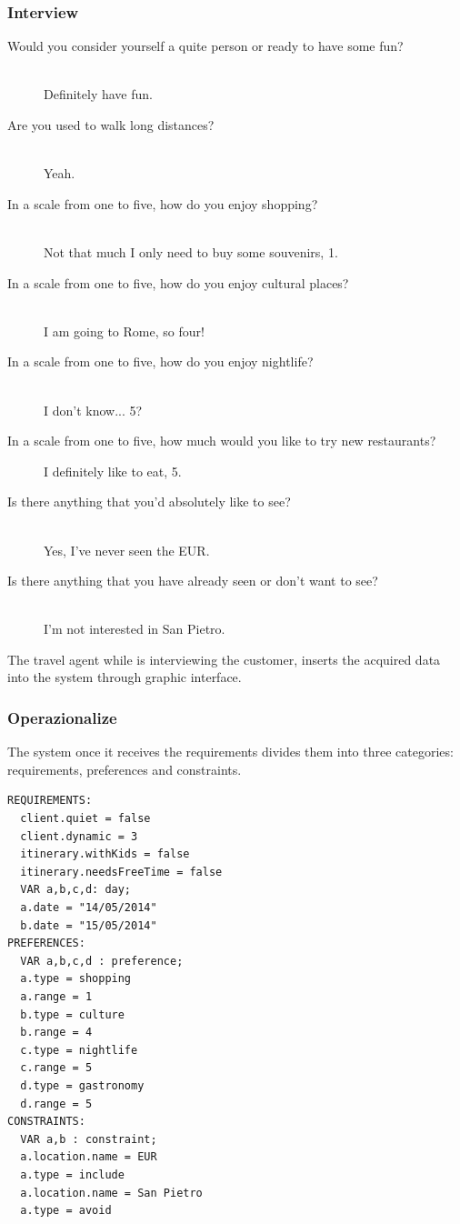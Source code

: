 \documentclass[11pt]{article} %
\begin{document}
\subsubsection{Interview} 

\begin{description}
  \item[Would you consider yourself a quite person or ready to have some fun?] \hfill \\
  Definitely have fun.
  \item[Are you used to walk long distances?] \hfill \\
  Yeah.
  \item[In a scale from one to five, how do you enjoy shopping?] \hfill \\
  Not that much I only need to buy some souvenirs, 1.
  \item[In a scale from one to five, how do you enjoy cultural places?] \hfill \\
  I am going to Rome, so four!
  \item[In a scale from one to five, how do you enjoy nightlife?] \hfill \\
  I don't know... 5?
  \item[In a scale from one to five, how much would you like to try new restaurants?] \hfill 
  I definitely like to eat, 5.
  \item[Is there anything that you'd absolutely like to see?] \hfill \\
  Yes, I've never seen the EUR.
  \item[Is there anything that you have already seen or don't want to see?] \hfill \\
  I'm not interested in San Pietro.
\end{description}

The travel agent while is interviewing the customer, inserts the acquired data into the system through graphic interface.

\subsubsection{Operazionalize}
The system once it receives the requirements divides them into three categories: requirements, preferences and constraints.

\begin{lstlisting}[label=Rules,caption=Domain instance of the data inserted into the system,breaklines=true,mathescape=true]
REQUIREMENTS:
  client.quiet = false
  client.dynamic = 3
  itinerary.withKids = false
  itinerary.needsFreeTime = false
  VAR a,b,c,d: day;
  a.date = "14/05/2014"
  b.date = "15/05/2014"
PREFERENCES:
  VAR a,b,c,d : preference;
  a.type = shopping
  a.range = 1
  b.type = culture
  b.range = 4
  c.type = nightlife
  c.range = 5
  d.type = gastronomy
  d.range = 5
CONSTRAINTS:
  VAR a,b : constraint;
  a.location.name = EUR
  a.type = include
  a.location.name = San Pietro
  a.type = avoid
\end{lstlisting}
\end{document}

